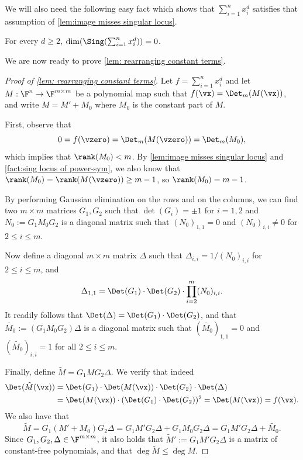 We will also need the following easy fact which shows that $\sum_{i=1}^n x_i ^d$ satisfies that assumption of \autoref{lem:image misses singular locus}.

\begin{fact}\label{fact:sing locus of power-sym}
For every $d \ge 2$, $\dim(\Sing(\sum_{i=1}^n x_i^d)) = 0$.
\end{fact}


We are now ready to prove \autoref{lem: rearranging constant terms}.

\begin{proof}[Proof of \autoref{lem: rearranging constant terms}]
Let $f = \sum_{i=1}^n x_i^d$ and let $M : \F^n \to \F^{m \times m}$ be a polynomial map such that $f(\vx)  = \Det_m(M(\vx))$, and write $M=M'+M_0$ where $M_0$ is the constant part of $M$.

First, observe that
\[
0 = f(\vzero) = \Det_m(M(\vzero)) = \Det_m(M_0),
\]
which implies that $\rank(M_0) < m$. By \autoref{lem:image misses singular locus} and \autoref{fact:sing locus of power-sym}, we also know that $\rank(M_0) = \rank(M(\vzero)) \ge m-1$, so $\rank(M_0) = m-1$.

By performing Gaussian elimination on the rows and on the columns, we can find two $m \times m$ matrices $G_1, G_2$ such that $\det(G_i) = \pm 1$ for $i=1,2$ and $N_0 := G_1 M_0 G_2$ is a diagonal matrix such that $(N_0)_{1,1} = 0$ and $(N_0)_{i,i} \neq 0$ for $2 \le i \le m$.

Now define a diagonal $m\times m$ matrix $\Delta$ such that $\Delta_{i,i} = 1/(N_0)_{i,i}$ for $2 \le i \le m$, and
\[
\Delta_{1,1} = \Det(G_1) \cdot \Det(G_2) \cdot \prod_{i=2}^m (N_0)_{i,i}.
\]
It readily follows that $\Det(\Delta) = \Det(G_1) \cdot \Det(G_2)$, and that $\tilde{M_0} := (G_1 M_0 G_2) \Delta$ is a diagonal matrix such that $(\tilde{M_0})_{1,1} = 0$ and $(\tilde{M_0})_{i,i} = 1$ for all $2 \le i \le m$.

Finally, define $\tilde{M} = G_1 M G_2 \Delta$. We verify that indeed
\begin{align*}
\Det(\tilde{M}(\vx)) &= \Det(G_1) \cdot \Det(M(\vx)) \cdot \Det(G_2) \cdot \Det(\Delta) \\
&= \Det(M(\vx)) \cdot (\Det(G_1) \cdot \Det(G_2))^2 = \Det(M(\vx)) = f(\vx).
\end{align*}
We also have that
\[
\tilde{M} = G_1 (M' + M_0) G_2 \Delta = G_1 M' G_2 \Delta + G_1 M_0 G_2 \Delta = G_1 M' G_2 \Delta + \tilde{M_0}.
\]
Since $G_1, G_2, \Delta \in \F^{m \times m}$, it also holds that $\tilde{M}' := G_1 M' G_2 \Delta$ is a matrix of constant-free polynomials, and that  $ \deg \tilde{M} \le  \deg M$. 
\end{proof}

